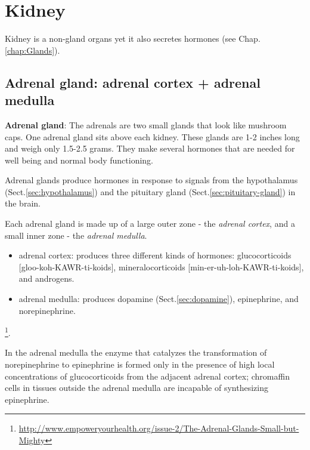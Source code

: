 \chapter{Kidney}
\label{chap:kidney}

Kidney is a non-gland organs yet it also secretes hormones (see
Chap.\ref{chap:Glands}).

\section{Adrenal gland: adrenal cortex + adrenal medulla}
\label{sec:adrenal-gland}
\label{sec:adrenal-medulla}
\label{sec:adrenal-cortex}

{\bf Adrenal gland}: The adrenals are two small glands that look like mushroom
caps. One adrenal gland sits above each kidney. These glands are 1-2 inches long
and weigh only 1.5-2.5 grams.
They make several hormones that are needed for well being and normal body
functioning.
  
Adrenal glands produce hormones in response to signals from the hypothalamus
(Sect.\ref{sec:hypothalamus}) and the pituitary gland
(Sect.\ref{sec:pituitary-gland}) in the brain.

Each adrenal gland is made up of a large outer zone - the {\it adrenal cortex},
and a small inner zone - the {\it adrenal medulla}.

\begin{itemize}

    \item adrenal cortex: produces three different kinds of hormones:
    glucocorticoids [gloo-koh-KAWR-ti-koids], mineralocorticoids
    [min-er-uh-loh-KAWR-ti-koids], and androgens.
  
    \item adrenal medulla: produces dopamine (Sect.\ref{sec:dopamine}),
    epinephrine, and norepinephrine.
    
\end{itemize}
\footnote{\url{http://www.empoweryourhealth.org/issue-2/The-Adrenal-Glands-Small-but-Mighty}}.

In the adrenal medulla the enzyme that catalyzes the transformation of
norepinephrine to epinephrine is formed only in the presence of high local
concentrations of glucocorticoids from the adjacent adrenal cortex; chromaffin
cells in tissues outside the adrenal medulla are incapable of synthesizing
epinephrine.

